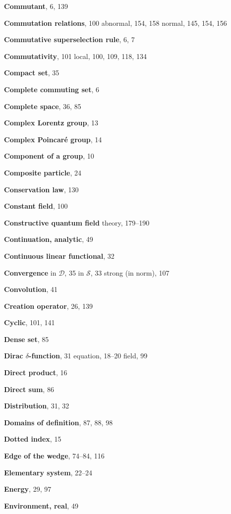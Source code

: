 \begin{theindex}
\item \textbf{Commutant}, 6, 139
\item \textbf{Commutation relations}, 100
\subitem abnormal, 154, 158
\subitem normal, 145, 154, 156
\item \textbf{Commutative superselection rule}, 6, 7
\item \textbf{Commutativity}, 101
\subitem local, 100, 109, 118, 134
\item \textbf{Compact set}, 35
\item \textbf{Complete commuting set}, 6
\item \textbf{Complete space}, 36, 85
\item \textbf{Complex Lorentz group}, 13
\item \textbf{Complex Poincaré group}, 14
\item \textbf{Component of a group}, 10
\item \textbf{Composite particle}, 24
\item \textbf{Conservation law}, 130
\item \textbf{Constant field}, 100
\item \textbf{Constructive quantum field}
\subitem theory, 179--190
\item \textbf{Continuation, analytic}, 49
\item \textbf{Continuous linear functional}, 32
\item \textbf{Convergence}
\subitem in $\mathcal{D}$, 35
\subitem in $\mathcal{S}$, 33
\subitem strong (in norm), 107
\item \textbf{Convolution}, 41
\item \textbf{Creation operator}, 26, 139
\item \textbf{Cyclic}, 101, 141

\indexspace
\item \textbf{Dense set}, 85
\item \textbf{Dirac $\delta$-function}, 31
\subitem equation, 18--20
\subitem field, 99
\item \textbf{Direct product}, 16
\item \textbf{Direct sum}, 86
\item \textbf{Distribution}, 31, 32
\item \textbf{Domains of definition}, 87, 88, 98
\item \textbf{Dotted index}, 15

\indexspace
\item \textbf{Edge of the wedge}, 74--84, 116
\item \textbf{Elementary system}, 22--24
\item \textbf{Energy}, 29, 97
\item \textbf{Environment, real}, 49


\end{theindex}
